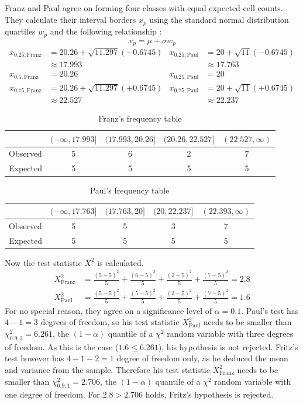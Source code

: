 \documentclass{article}
\begin{document}
Franz and Paul agree on forming four classes with equal expected cell counts.
They calculate their interval borders $x_p$ using the standard normal distribution quartiles $w_p$ and the following relationship \cite{conover1980practical}:
\begin{equation*}
	x_p = \mu + \sigma w_p
\end{equation*}
%
\begin{align*}
	x_{0.25, \text{Franz}} &= 20.26 + \sqrt{11.297}(-0.6745) & x_{0.25, \text{Paul}} &= 20 + \sqrt{11}(-0.6745) \\
	&\approx 17.993 & &\approx 17.763 \\[1ex]
	x_{0.5, \text{Franz}} &= 20.26 & x_{0.25, \text{Paul}} &= 20 \\[1ex]
	x_{0.75, \text{Franz}} &= 20.26 + \sqrt{11.297}(+0.6745) & x_{0.75, \text{Paul}} &= 20 + \sqrt{11}(+0.6745) \\
	&\approx 22.527 & &\approx 22.237
\end{align*}
%
\begin{table}[h]
\center
\caption{Franz's frequency table}
\begin{tabular}{l|cccc}
	& $(-\infty, 17.993]$ & $(17.993, 20.26]$ & $(20.26, 22.527]$ & $(22.527,\infty)$ \\
	\hline
	Observed & 5 & 6 & 2 & 7 \\
	Expected & 5 & 5 & 5 & 5 \\
\end{tabular}
\end{table}
\begin{table}[h]
\center
\caption{Paul's frequency table}
\begin{tabular}{l|cccc}
	& $(-\infty, 17.763]$ & $(17.763, 20]$ & $(20, 22.237]$ & $(22.393,\infty)$ \\
	\hline
	Observed & 5 & 5 & 3 & 7 \\
	Expected & 5 & 5 & 5 & 5 \\
\end{tabular}
\end{table}
Now the test statistic $X^2$ is calculated.
\begin{align*}
	X^2_{\text{Franz}} &= \frac{(5-5)^2}{5} + \frac{(6-5)^2}{5} + \frac{(2-5)^2}{5} + \frac{(7-5)^2}{5} = 2.8
	\\[1ex]
	X^2_{\text{Paul}} &= \frac{(5-5)^2}{5} + \frac{(5-5)^2}{5} + \frac{(3-5)^2}{5} + \frac{(7-5)^2}{5} = 1.6
\end{align*}
%
For no special reason, they agree on a significance level of $\alpha = 0.1$.
Paul's test has $4-1=3$ degrees of freedom, so his test statistic $X^2_{\text{Paul}}$ needs to be smaller than $\chi^2_{0.9, 3} = 6.261$, the $(1-\alpha)$ quantile of a $\chi^2$ random variable with three degrees of freedom.
As this is the case ($1.6 \leq 6.261$), his hypothesis is not rejected.
Fritz's test however has $4-1-2=1$ degree of freedom only, as he deduced the mean and variance from the sample.
Therefore his test statistic $X^2_{\text{Franz}}$ needs to be smaller than $\chi^2_{0.9, 1} = 2.706$, the $(1-\alpha)$ quantile of a $\chi^2$ random variable with one degree of freedom.
For $2.8 > 2.706$ holds, Fritz's hypothesis is rejected.
\end{document}
